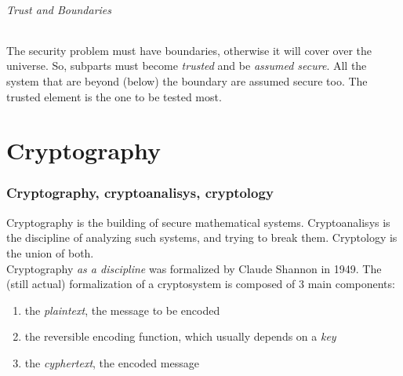 \documentclass{article}
\begin{document}
				\paragraph{Trust and Boundaries}
					The security problem must have boundaries, otherwise it will cover over the universe. So, subparts must become \emph{trusted} and be \emph{assumed secure}. All the system that are beyond (below) the boundary are assumed secure too. The trusted element is the one to be tested most. 
			
	\clearpage \part{Cryptography}
		\section{Cryptography, cryptoanalisys, cryptology}
			Cryptography is the building of secure mathematical systems. Cryptoanalisys is the discipline of analyzing such systems, and trying to break them. Cryptology is the union of both.\\
			Cryptography \emph{as a discipline} was formalized by Claude Shannon in 1949. The (still actual) formalization of a cryptosystem is composed of 3 main components:
			\begin{enumerate}
				\item the \emph{plaintext}, the message to be encoded
				\item the reversible encoding function, which usually depends on a \emph{key}
				\item the \emph{cyphertext}, the encoded message
			\end{enumerate}
			
\end{document}
